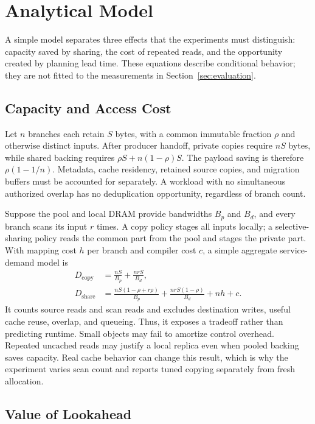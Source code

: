 \section{Analytical Model}
\label{sec:analysis}

A simple model separates three effects that the experiments must distinguish:
capacity saved by sharing, the cost of repeated reads, and the opportunity
created by planning lead time. These equations describe conditional behavior;
they are not fitted to the measurements in Section~\ref{sec:evaluation}.

\subsection{Capacity and Access Cost}

Let $n$ branches each retain $S$ bytes, with a common immutable fraction
$\rho$ and otherwise distinct inputs. After producer handoff, private copies
require $nS$ bytes, while shared backing requires
$\rho S+n(1-\rho)S$. The payload saving is therefore $\rho(1-1/n)$.
Metadata, cache residency, retained source copies, and migration buffers must
be accounted for separately. A workload with no simultaneous authorized
overlap has no deduplication opportunity, regardless of branch count.

Suppose the pool and local DRAM provide bandwidths $B_p$ and $B_d$, and every
branch scans its input $r$ times. A copy policy stages all inputs locally; a
selective-sharing policy reads the common part from the pool and stages the
private part. With mapping cost $h$ per branch and compiler cost $c$, a simple
aggregate service-demand model is
\begin{align}
 D_{\mathrm{copy}} &= \frac{nS}{B_p}+\frac{nrS}{B_d}, \\
 D_{\mathrm{share}} &= \frac{nS(1-\rho+r\rho)}{B_p}
   +\frac{nrS(1-\rho)}{B_d}+nh+c.
\end{align}
It counts source reads and scan reads and excludes destination writes, useful
cache reuse, overlap, and queueing. Thus, it exposes a tradeoff rather than
predicting runtime.
Small objects may fail to amortize control overhead. Repeated uncached reads
may justify a local replica even when pooled backing saves capacity. Real
cache behavior can change this result, which is why the experiment varies
scan count and reports tuned copying separately from fresh allocation.

\subsection{Value of Lookahead}

